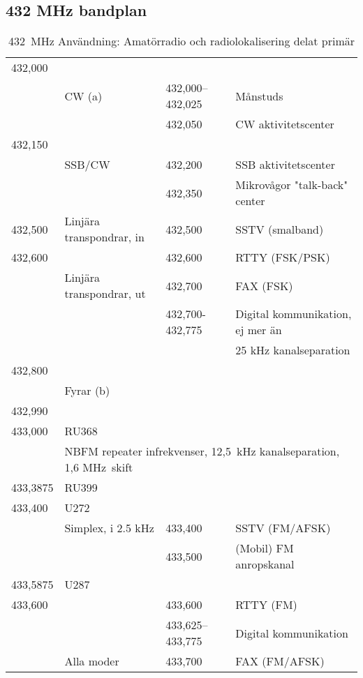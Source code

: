 \subsection{432 MHz bandplan}

\setlongtables
\begin{longtable}{llll}
\caption{432~MHz Användning: Amatörradio och radiolokalisering delat primär} \\
432,000 &        & & \\
        & CW (a) & 432,000--432,025 & Månstuds \\
        &        & 432,050           & CW aktivitetscenter \\
432,150 &        & & \\
        & SSB/CW & 432,200           & SSB aktivitetscenter \\
        &        & 432,350           & Mikrovågor "talk-back" center \\
432,500 & Linjära transpondrar, in & 432,500 & SSTV (smalband) \\
432,600 &                          & 432,600 & RTTY (FSK/PSK) \\
        & Linjära transpondrar, ut & 432,700 & FAX (FSK) \\
        &                          & 432,700- 432,775 & Digital kommunikation, ej mer än \\
        &                          &         & 25 kHz kanalseparation \\
432,800 & & & \\
        & \multicolumn{3}{l}{Fyrar (b)} \\
432,990 & & & \\
433,000 & RU368 & & \\
        & \multicolumn{3}{l}{NBFM repeater infrekvenser, 12,5~kHz kanalseparation, 1,6 MHz~skift} \\
433,3875 & RU399 & & \\
433,400 & U272 & & \\
        & Simplex, i 2.5 kHz & 433,400 & SSTV (FM/AFSK) \\
        &                    & 433,500 & (Mobil) FM anropskanal \\
433,5875 & U287 & & \\
433,600 &            & 433,600           & RTTY (FM) \\
        &            & 433,625--433,775 & Digital kommunikation \\
        & Alla moder & 433,700           & FAX (FM/AFSK) \\

\end{longtable}
